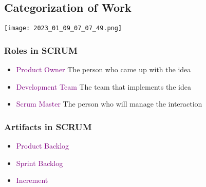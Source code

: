 \documentclass[main.tex,fontsize=12pt,paper=a4,paper=landscape,DIV=calc,]{scrartcl}
\begin{document}
\begin{multicols*}{2}
\subsection{Categorization of Work}
\texttt{[image: 2023\_01\_09\_07\_07\_49.png]}

\subsubsection{Roles in SCRUM}
\begin{itemize}
\item \textcolor{purple}{Product Owner}\newline
  The person who came up with the idea
\item \textcolor{purple}{Development Team}\newline
  The team that implements the idea
\item \textcolor{purple}{Scrum Master}\newline
  The person who will manage the interaction
\end{itemize} 

\subsubsection{Artifacts in SCRUM}
\begin{itemize}
\item \textcolor{purple}{Product Backlog}
\item \textcolor{purple}{Sprint Backlog}
\item \textcolor{purple}{Increment}
\end{itemize} 


\end{multicols*}
\end{document}
